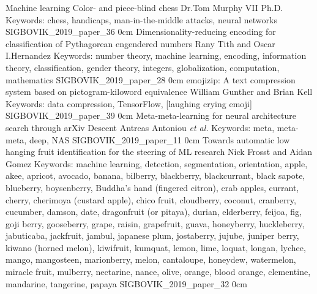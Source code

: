 \addtrack
	{}{Machine learning}
\addpaper
	{Color- and piece-blind chess}
	{Dr.\@ Tom Murphy VII Ph.D.}
	{Keywords: chess, handicaps, man-in-the-middle attacks, neural networks}
	{SIGBOVIK_2019_paper_36}
	{0cm}
	{}
\addpaper
	{Dimensionality-reducing encoding for classification of Pythagorean engendered numbers}
	{Rany Tith and Oscar I.\@ Hernandez}
	{Keywords: number theory, machine learning, encoding, information theory, classification, gender theory, integers, globalization, computation, mathematics}
	{SIGBOVIK_2019_paper_28}
	{0cm}
	{}
\addpaper
	{emojizip: A text compression system based on pictogram-kiloword equivalence}
	{William Gunther and Brian Kell}
	{Keywords: data compression, TensorFlow, [laughing crying emoji]}
	{SIGBOVIK_2019_paper_39}
	{0cm}
	{}
\addpaper
	{Meta-meta-learning for neural architecture search through arXiv Descent}
	{Antreas Antoniou \textit{et al.}}
	{Keywords: meta, meta-meta, deep, NAS}
	{SIGBOVIK_2019_paper_11}
	{0cm}
	{}
\addpaper
	{Towards automatic low hanging fruit identification for the steering of ML research}
	{Nick Frosst and Aidan Gomez}
	{Keywords: machine learning, detection, segmentation, orientation, apple, akee, apricot, avocado, banana, bilberry, blackberry, blackcurrant, black sapote, blueberry, boysenberry, Buddha's hand (fingered citron), crab apples, currant, cherry, cherimoya (custard apple), chico fruit, cloudberry, coconut, cranberry, cucumber, damson, date, dragonfruit (or pitaya), durian, elderberry, feijoa, fig, goji berry, gooseberry, grape, raisin, grapefruit, guava, honeyberry, huckleberry, jabuticaba, jackfruit, jambul, japanese plum, jostaberry, jujube, juniper berry, kiwano (horned melon), kiwifruit, kumquat, lemon, lime, loquat, longan, lychee, mango, mangosteen, marionberry, melon, cantaloupe, honeydew, watermelon, miracle fruit, mulberry, nectarine, nance, olive, orange, blood orange, clementine, mandarine, tangerine, papaya}
	{SIGBOVIK_2019_paper_32}
	{0cm}
	{}

